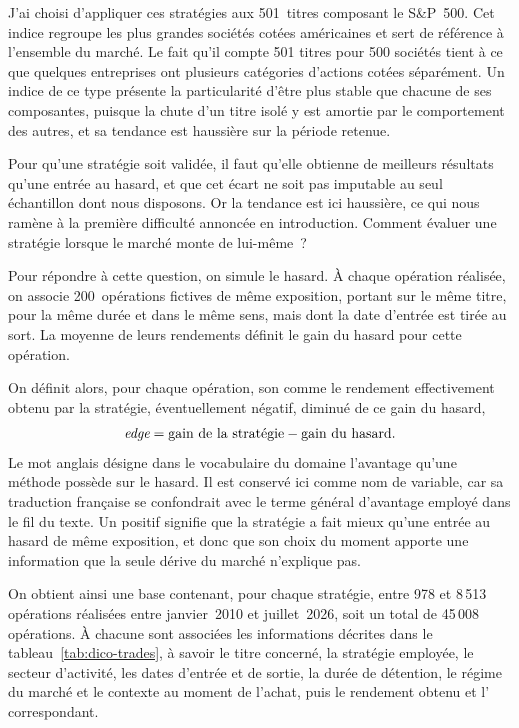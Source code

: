 J'ai choisi d'appliquer ces stratégies aux 501~titres composant le S\&P~500.
Cet indice regroupe les plus grandes sociétés cotées américaines et sert de
référence à l'ensemble du marché. Le fait qu'il compte 501 titres pour 500
sociétés tient à ce que quelques entreprises ont plusieurs catégories
d'actions cotées séparément. Un indice de ce type présente la particularité
d'être plus stable que chacune de ses composantes, puisque la chute d'un
titre isolé y est amortie par le comportement des autres, et sa tendance est
haussière sur la période retenue.

Pour qu'une stratégie soit validée, il faut qu'elle obtienne de meilleurs
résultats qu'une entrée au hasard, et que cet écart ne soit pas imputable au
seul échantillon dont nous disposons. Or la tendance est ici haussière, ce
qui nous ramène à la première difficulté annoncée en introduction. Comment
évaluer une stratégie lorsque le marché monte de lui-même~?

Pour répondre à cette question, on simule le hasard. À chaque opération
réalisée, on associe 200~opérations fictives de même exposition, portant sur
le même titre, pour la même durée et dans le même sens, mais dont la date
d'entrée est tirée au sort. La moyenne de leurs rendements définit le gain du
hasard pour cette opération.

On définit alors, pour chaque opération, son \edgevar{} comme le rendement
effectivement obtenu par la stratégie, éventuellement négatif, diminué de ce
gain du hasard,
\[
  \textit{edge} = \text{gain de la stratégie} - \text{gain du hasard}.
\]
Le mot anglais \edgevar{} désigne dans le vocabulaire du domaine l'avantage
qu'une méthode possède sur le hasard. Il est conservé ici comme nom de
variable, car sa traduction française se confondrait avec le terme général
d'avantage employé dans le fil du texte. Un \edgevar{} positif signifie que
la stratégie a fait mieux qu'une entrée au hasard de même exposition, et donc
que son choix du moment apporte une information que la seule dérive du marché
n'explique pas.

On obtient ainsi une base contenant, pour chaque stratégie, entre 978 et
8\,513 opérations réalisées entre janvier~2010 et juillet~2026, soit un total
de 45\,008 opérations. À chacune sont associées les informations décrites
dans le tableau~\ref{tab:dico-trades}, à savoir le titre concerné, la
stratégie employée, le secteur d'activité, les dates d'entrée et de sortie,
la durée de détention, le régime du marché et le contexte au moment de
l'achat, puis le rendement obtenu et l'\edgevar{} correspondant.

